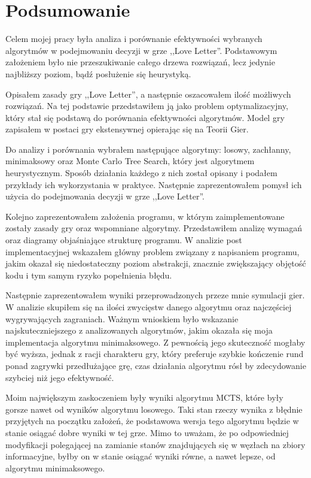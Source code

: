\chapter{Podsumowanie}
\label{cha:rozdz6}

Celem mojej pracy była analiza i porównanie efektywności wybranych algorytmów w podejmowaniu decyzji w grze ,,Love Letter''. Podstawowym założeniem było nie przeszukiwanie całego drzewa rozwiązań, lecz jedynie najbliższy poziom, bądź posłużenie się heurystyką.

Opisałem zasady gry ,,Love Letter'', a następnie oszacowałem ilość możliwych rozwiązań. Na tej podstawie przedstawiłem ją jako problem optymalizacyjny, który stał się podstawą do porównania efektywności algorytmów. Model gry zapisałem w postaci gry ekstensywnej opierając się na Teorii Gier.

Do analizy i porównania wybrałem następujące algorytmy: losowy, zachłanny, minimaksowy oraz Monte Carlo Tree Search, który jest algorytmem heurystycznym. Sposób działania każdego z nich został opisany i podałem przykłady ich wykorzystania w praktyce. Następnie zaprezentowałem pomysł ich użycia do podejmowania decyzji w grze ,,Love Letter''.

Kolejno zaprezentowałem założenia programu, w którym zaimplementowane zostały zasady gry oraz wspomniane algorytmy. Przedstawiłem analizę wymagań oraz diagramy objaśniające strukturę programu. W analizie post implementacyjnej wskazałem główny problem związany z napisaniem programu, jakim okazał się niedostateczny poziom abstrakcji, znacznie zwiększający objętość kodu i tym samym ryzyko popełnienia błędu.

Następnie zaprezentowałem wyniki przeprowadzonych przeze mnie symulacji gier. W analizie skupiłem się na ilości zwycięstw danego algorytmu oraz najczęściej wygrywających zagraniach. Ważnym wnioskiem było wskazanie najskuteczniejszego z analizowanych algorytmów, jakim okazała się moja implementacja algorytmu minimaksowego. Z pewnością jego skuteczność mogłaby być wyższa, jednak z racji charakteru gry, który preferuje szybkie kończenie rund ponad zagrywki przedłużające grę, czas działania algorytmu rósł by zdecydowanie szybciej niż jego efektywność. 

Moim największym zaskoczeniem były wyniki algorytmu MCTS, które były gorsze nawet od wyników algorytmu losowego. Taki stan rzeczy wynika z błędnie przyjętych na początku założeń, że podstawowa wersja tego algorytmu będzie w stanie osiągać dobre wyniki w tej grze. Mimo to uważam, że po odpowiedniej modyfikacji polegającej na zamianie stanów znajdujących się w węzłach na zbiory informacyjne, byłby on w stanie osiągać wyniki równe, a nawet lepsze, od algorytmu minimaksowego.